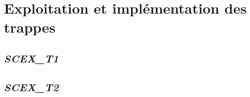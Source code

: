 \section{Exploitation et implémentation des trappes}
\subsection{\textit{SCEX\_T1}}

\subsection{\textit{SCEX\_T2}}